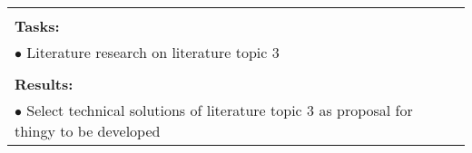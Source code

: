 \begin{table}[!h]
\begin{center}
\begin{tabular}{|p{}||p{}|p{}||p{}|}
            \multicolumn{4}{|p{.95\columnwidth}|}{}\\
            \multicolumn{4}{|p{.95\columnwidth}|}{\textbf{Tasks:}}\\
            \multicolumn{4}{|p{.95\columnwidth}|}{$\bullet$ Literature research on literature topic 3}\\            \multicolumn{4}{|p{.95\columnwidth}|}{}\\
            \multicolumn{4}{|p{.95\columnwidth}|}{\textbf{Results:}}\\
            \multicolumn{4}{|p{.95\columnwidth}|}{$\bullet$ Select technical solutions of literature topic 3 as proposal for thingy to be developed}\\
            \hline
        \end{tabular}
    \end{center}
\end{table}

\clearpage


